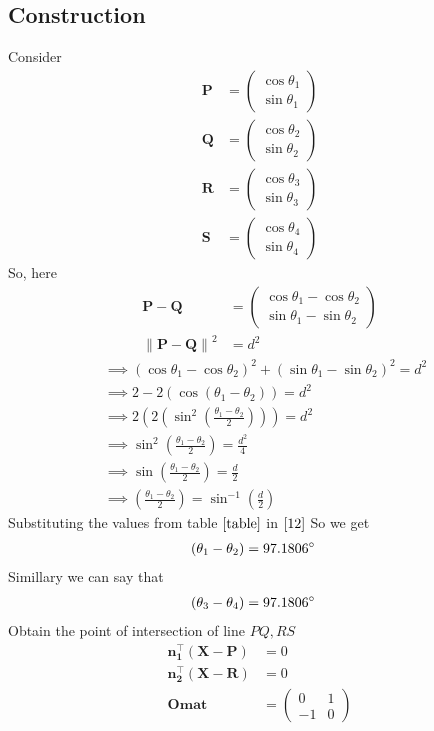 \documentclass[10pt]{article}
\providecommand{\brak}[1]{\ensuremath{\left(#1\right)}}
\providecommand{\norm}[1]{\left\lVert#1\right\rVert}
\newcommand{\myvec}[1]{\ensuremath{\begin{pmatrix}#1\end{pmatrix}}}
\let\vec\mathbf
\begin{document}
\begin{enumerate}
\section*{\large Construction}
Consider
\begin{eqnarray}
\vec{P}&=\myvec{\cos \theta_1\\\sin \theta_1}
\\
\vec{Q}&=\myvec{\cos \theta_2\\\sin \theta_2}
\\
\vec{R}&=\myvec{\cos \theta_3\\\sin \theta_3}
\\
\vec{S}&=\myvec{\cos \theta_4\\\sin \theta_4}
\end{eqnarray}\label{table1}
So, here
\begin{align}
	\vec{P}-\vec{Q}&=\myvec{\cos\theta_1-\cos\theta_2 \\ \sin \theta_1-\sin \theta_2}
	\\
\norm{\vec{P}-\vec{Q}}^2&=d^2
\end{align}
		\begin{align}
	&\implies\brak{\cos \theta_1-\cos \theta_2}^2+\brak{\sin \theta_1-\sin \theta_2}^2=d^2\\
	&\implies2-2\brak{\cos\brak{\theta_1-\theta_2}}=d^2\\
	&\implies2\brak{2\brak{{\sin^2}\brak{\frac{\theta_1-\theta_2}{2}}}}=d^2\\
	&\implies\sin^2\brak{\frac{\theta_1-\theta_2}{2}}=\frac{d^2}{4}\\
	&\implies\sin\brak{\frac{\theta_1-\theta_2}{2}}=\frac{d}{2}\\
&\implies\brak{\frac{\theta_1-\theta_2}{2}}=\sin^{-1}\brak{\frac{d}{2}}\label{12}
	\end{align}
	Substituting the values from table $\eqref{table}$ in $\eqref{12}$ So we get
	\begin{align}
	\brak{\theta_1-\theta_2}&=97.1806\degree
	\end{align}
Simillary we can say that
\begin{align}
	\brak{\theta_3-\theta_4}&=97.1806\degree 		       
\end{align}
Obtain the point of intersection of line $PQ,RS$
\begin{align}
\vec{{n}_1^{\top}}\brak{\vec{X}-\vec{P}}&=0\\
\vec{{n}_2^{\top}}\brak{\vec{X}-\vec{R}}&=0\\
\vec{Omat}&=\myvec{0&1\\-1&0}\\

\end{align}
\end{enumerate}
\end{document}
